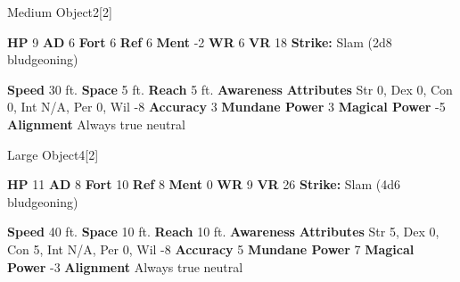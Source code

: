   

  \begin{monsubsection}{Medium Object}{2}[2]
    \vspace{-1em}\vspace{-1em}
    \vspace{0em}

    
    

    \begin{spellcontent}
      \begin{spelltargetinginfo}
        \pari \textbf{HP} 9 \monsep
          \textbf{AD} 6 \monsep
          \textbf{Fort} 6 \monsep
          \textbf{Ref} 6 \monsep
          \textbf{Ment} -2
        \pari \textbf{WR} 6 \monsep
        \textbf{VR} 18
        \pari \textbf{Strike:}
            Slam  (2d8 bludgeoning)
      \end{spelltargetinginfo}
    \end{spellcontent}
    \begin{monsterfooter}
      \pari \textbf{Speed} 30 ft. \monsep
        \textbf{Space} 5 ft. \monsep
        \textbf{Reach} 5 ft.
      \pari \textbf{Awareness} 
      \pari \textbf{Attributes}
        Str 0, Dex 0,
        Con 0, Int N/A,
        Per 0, Wil -8
      \pari \textbf{Accuracy} 3 \monsep
        \textbf{Mundane Power} 3 \monsep
      \textbf{Magical Power} -5
      \pari \textbf{Alignment} Always true neutral
    \end{monsterfooter}
  \end{monsubsection}
  
  

  \begin{monsubsection}{Large Object}{4}[2]
    \vspace{-1em}\vspace{-1em}
    \vspace{0em}

    
    

    \begin{spellcontent}
      \begin{spelltargetinginfo}
        \pari \textbf{HP} 11 \monsep
          \textbf{AD} 8 \monsep
          \textbf{Fort} 10 \monsep
          \textbf{Ref} 8 \monsep
          \textbf{Ment} 0
        \pari \textbf{WR} 9 \monsep
        \textbf{VR} 26
        \pari \textbf{Strike:}
            Slam  (4d6 bludgeoning)
      \end{spelltargetinginfo}
    \end{spellcontent}
    \begin{monsterfooter}
      \pari \textbf{Speed} 40 ft. \monsep
        \textbf{Space} 10 ft. \monsep
        \textbf{Reach} 10 ft.
      \pari \textbf{Awareness} 
      \pari \textbf{Attributes}
        Str 5, Dex 0,
        Con 5, Int N/A,
        Per 0, Wil -8
      \pari \textbf{Accuracy} 5 \monsep
        \textbf{Mundane Power} 7 \monsep
      \textbf{Magical Power} -3
      \pari \textbf{Alignment} Always true neutral
    \end{monsterfooter}
  \end{monsubsection}
  
